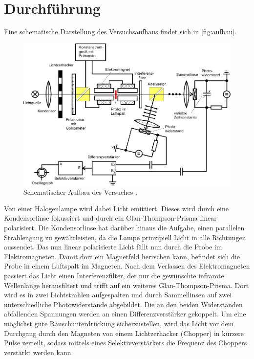 \section{Durchführung}
\label{sec:durchführung}

Eine schematische Darstellung des Versuchsaufbaus findet sich in \autoref{fig:aufbau}.

\begin{figure}[H]
    \centering
    \includegraphics{figures/Aufbau.pdf}
    \caption{Schematischer Aufbau des Versuches \cite{v46}.}
    \label{fig:aufbau}
\end{figure}

Von einer Halogenlampe wird dabei Licht emittiert. Dieses wird durch eine Kondensorlinse fokussiert und durch ein Glan-Thompson-Prisma linear polarisiert.
Die Kondensorlinse hat darüber hinaus die Aufgabe, einen parallelen Strahlengang zu gewährleisten, da die Lampe prinzipiell Licht in alle Richtungen aussendet.
Das nun linear polarisierte Licht fällt nun durch die Probe im Elektromagneten.
Damit dort ein Magnetfeld herrschen kann, befindet sich die Probe in einem Luftspalt im Magneten.
Nach dem Verlassen des Elektromagneten passiert das Licht einen Interferenzfilter, der nur die gewünschte infrarote Wellenlänge herausfiltert und
trifft auf ein weiteres Glan-Thompson-Prisma.
Dort wird es in zwei Lichtstrahlen aufgespalten und durch Sammellinsen auf zwei unterschiedliche Photowiderstände abgebildet.
Die an den beiden Widerständen abfallenden Spannungen werden an einen Differenzverstärker gekoppelt.
Um eine möglichst gute Rauschunterdrückung sicherzustellen, wird das Licht vor dem Durchgang durch den Magneten von einem Lichtzerhacker (Chopper) in kürzere Pulse zerteilt,
sodass mittels eines Selektivverstärkers die Frequenz des Choppers verstärkt werden kann.

